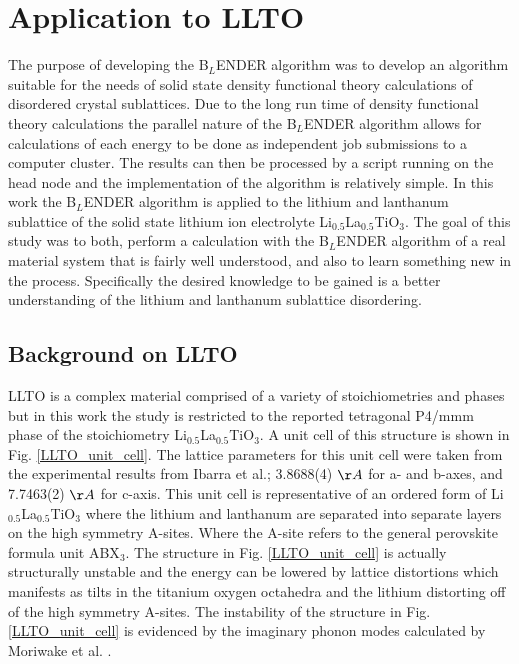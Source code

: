 \documentclass[aps,pre,reprint,superscriptaddress,showkeys]{revtex4-2}
\begin{document}
\section{Application to LLTO}
\label{sec4}
The purpose of developing the B$_L$ENDER algorithm was to develop an algorithm suitable for the needs of solid state density functional theory calculations of disordered crystal sublattices.  Due to the long run time of density functional theory calculations  the parallel nature of the B$_L$ENDER algorithm allows for calculations of each energy to be done as independent job submissions to a computer cluster. The results can then be processed by a script running on the head node and the implementation of the algorithm is relatively simple.  In this work the B$_L$ENDER algorithm is applied to the lithium and lanthanum sublattice of the solid state lithium ion electrolyte  Li$_{0.5}$La$_{0.5}$TiO$_{3}$. The goal of this study was to both, perform a calculation with the B$_L$ENDER algorithm  of a real material system that is fairly well understood, and also to learn something new in the process.  Specifically the desired knowledge to be gained is a better understanding of the lithium and lanthanum sublattice disordering. 



\subsection{Background on LLTO}
LLTO is a complex material comprised of a variety of stoichiometries and phases but in this work the study is restricted to the reported tetragonal P4/mmm phase of the stoichiometry Li$_{0.5}$La$_{0.5}$TiO$_{3}$\cite{LLTOreview,P4mmmstrucuture}. A unit cell of this structure is shown in Fig. \ref{LLTO_unit_cell}. The lattice parameters for this unit cell were taken from the experimental results from Ibarra et al.\cite{P4mmmstrucuture}; 3.8688(4) $\AA$ for a- and b-axes, and 7.7463(2) $\AA$ for c-axis.  This unit cell is representative of an ordered form of Li$_{0.5}$La$_{0.5}$TiO$_{3}$ where the lithium and lanthanum are separated into separate layers on the high symmetry A-sites. Where the A-site refers to the general perovskite formula unit ABX$_3$.  The structure in Fig. \ref{LLTO_unit_cell} is actually structurally unstable and the energy can be lowered by lattice distortions which manifests as tilts in the titanium oxygen octahedra and the lithium  distorting off of the high symmetry A-sites. The instability of the structure in Fig. \ref{LLTO_unit_cell} is evidenced by the imaginary phonon modes calculated by Moriwake et al. \cite{imaginaryphonons}.  
\end{document}
